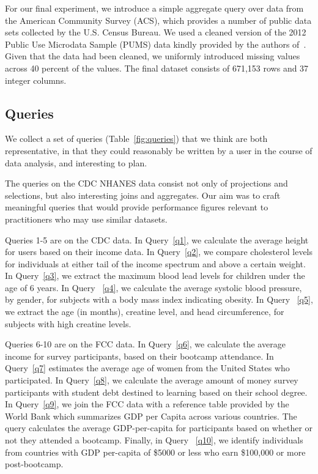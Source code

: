 For our final experiment, we introduce a simple aggregate query over data from the American Community Survey (ACS), which
provides a number of public data sets collected by the U.S. Census Bureau.
We used a cleaned version of the 2012 Public Use Microdata Sample (PUMS) data kindly provided by the authors of~\cite{akande2015empirical}.
Given that the data had been cleaned, we uniformly introduced missing values across 40 percent of the values. The final dataset consists
of 671,153 rows and 37 integer columns.

\subsection{Queries}
We collect a set of queries (Table~\ref{fig:queries}) that we think are both representative, in that they could reasonably be written by a user in the course of data analysis, and interesting to plan.

The queries on the CDC NHANES data consist not only of projections and selections,
but also interesting joins and aggregates. Our aim was to craft meaningful queries
that would provide performance figures relevant to practitioners who may use
similar datasets.

Queries 1-5 are on the CDC data. In Query~\ref{q1}, we calculate the average height for users based on their income data. In Query~\ref{q2},
we compare cholesterol levels for individuals at either tail of the income
spectrum and above a certain weight. In Query~\ref{q3},
we extract the maximum blood lead levels for children under the age of 6 years. In Query ~\ref{q4}, we calculate the average systolic blood pressure, by gender, for subjects with a body mass index indicating obesity. In Query ~\ref{q5}, we extract the age (in months), creatine level, and head circumference, for subjects with high creatine levels.


Queries 6-10 are on the FCC data. In Query~\ref{q6}, we calculate the average income for survey participants,
based on their bootcamp attendance. In Query~\ref{q7} estimates the average
age of women from the United States who participated. In Query~\ref{q8}, we 
calculate the average amount of money survey participants with student debt destined to
learning based on their school degree. In Query~\ref{q9}, we join the FCC data with a reference table provided
by the World Bank which summarizes GDP per Capita across various
countries\cite{worldbank-data}. The query calculates the average GDP-per-capita for participants based on whether or not they
attended a bootcamp. Finally, in Query ~\ref{q10}, we identify individuals from countries with GDP per-capita of \$5000 or
less who earn \$100,000 or more post-bootcamp.

